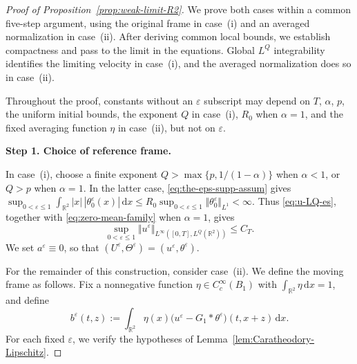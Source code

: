 \documentclass[reqno,11pt,a4paper]{amsart}
\newcommand{\dd}{\mathrm{d}}
\begin{document}
\begin{proof}[Proof of Proposition~\ref{prop:weak-limit-R2}]
We prove both cases within a common five-step argument,
using the original frame in case~(i) and an averaged
normalization in case~(ii).
After deriving common local bounds, we establish compactness
and pass to the limit in the equations.
Global $L^Q$ integrability identifies the limiting velocity
in case~(i), and the averaged normalization does so in case~(ii).


Throughout the proof, constants without an $\varepsilon$ subscript
may depend on $T$, $\alpha$, $p$, the uniform initial bounds,
the exponent $Q$ in case~(i), $R_0$ when $\alpha=1$,
and the fixed averaging function $\eta$ in case~(ii),
but not on $\varepsilon$.

\medskip
\noindent\textbf{Step 1. Choice of reference frame.}

In case~(i), choose a finite exponent
$Q>\max\{p,1/(1-\alpha)\}$ when $\alpha<1$,
or $Q>p$ when $\alpha=1$.
In the latter case, \eqref{eq:the-eps-supp-assum} gives
$\sup_{0<\varepsilon\leq1}
  \int_{\mathbb R^2}|x|\,|\theta_0^\varepsilon(x)|\,\dd x
  \leq R_0\sup_{0<\varepsilon\leq1}
      \Vert \theta_0^\varepsilon\Vert _{L^1}<\infty$.
Thus \eqref{eq:u-LQ-es}, together with
\eqref{eq:zero-mean-family} when $\alpha=1$, gives
\begin{equation}\label{eq:limit-u-LQ-bound}
  \sup_{0<\varepsilon\leq1}
  \Vert u^\varepsilon\Vert _{L^\infty([0,T],L^Q(\mathbb R^2))}
  \leq C_T.
\end{equation}
We set $a^\varepsilon\equiv0$, so that
$(U^\varepsilon,\Theta^\varepsilon)
=(u^\varepsilon,\theta^\varepsilon)$.


For the remainder of this construction, consider case~(ii).
We define the moving frame as follows.
Fix a nonnegative function
$\eta\in C_c^\infty(B_1)$ with
$\int_{\mathbb R^2}\eta\,\dd x=1$, and define
\[
  b^\varepsilon(t,z)
  :=\int_{\mathbb R^2}\eta(x)
  \bigl(u^\varepsilon-G_1*\theta^\varepsilon\bigr)
  (t,x+z)\,\dd x.
\]
For each fixed $\varepsilon$, we verify the hypotheses of
Lemma~\ref{lem:Caratheodory-Lipschitz}.


\end{proof}
\end{document}
